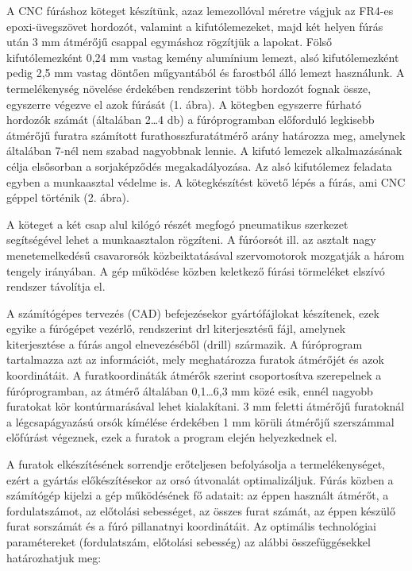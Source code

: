 \documentclass[../labor.tex]{subfiles}
\begin{document}
    A CNC fúráshoz köteget készítünk, azaz lemezollóval méretre vágjuk az FR4-es epoxi-üvegszövet hordozót, valamint a kifutólemezeket, majd két helyen fúrás után 3 mm átmérőjű csappal egymáshoz rögzítjük a lapokat. Fölső kifutólemezként 0,24 mm vastag kemény alumínium lemezt, alsó kifutólemezként pedig 2,5 mm vastag döntően műgyantából és farostból álló lemezt használunk. A termelékenység növelése érdekében rendszerint több hordozót fognak össze, egyszerre végezve el azok fúrását (1. ábra). A kötegben egyszerre fúrható hordozók számát (általában 2…4 db) a fúróprogramban előforduló legkisebb átmérőjű furatra számított furathosszfuratátmérő arány határozza meg, amelynek általában 7-nél nem szabad nagyobbnak lennie. A kifutó lemezek alkalmazásának célja elsősorban a sorjaképződés megakadályozása. Az alsó kifutólemez feladata egyben a munkaasztal védelme is. A kötegkészítést követő lépés a fúrás, ami CNC géppel történik (2. ábra).
    



    A köteget a két csap alul kilógó részét megfogó pneumatikus szerkezet segítségével lehet a munkaasztalon rögzíteni. A fúróorsót ill. az asztalt nagy menetemelkedésű csavarorsók közbeiktatásával szervomotorok mozgatják a három tengely irányában. A gép működése közben keletkező fúrási törmeléket elszívó rendszer távolítja el.

    A számítógépes tervezés (CAD) befejezésekor gyártófájlokat készítenek, ezek egyike a fúrógépet vezérlő, rendszerint drl kiterjesztésű fájl, amelynek kiterjesztése a fúrás angol elnevezéséből (drill) származik. A fúróprogram tartalmazza azt az információt, mely meghatározza furatok átmérőjét és azok koordinátáit. A furatkoordináták átmérők szerint csoportosítva szerepelnek a fúróprogramban, az átmérő általában 0,1…6,3 mm közé esik, ennél nagyobb furatokat kör kontúrmarásával lehet kialakítani. 3 mm feletti átmérőjű furatoknál a légcsapágyazású orsók kímélése érdekében 1 mm körüli átmérőjű szerszámmal előfúrást végeznek, ezek a furatok a program elején helyezkednek el.
    
    A furatok elkészítésének sorrendje erőteljesen befolyásolja a termelékenységet, ezért a gyártás előkészítésekor az orsó útvonalát optimalizáljuk. Fúrás közben a számítógép kijelzi a gép működésének fő adatait: az éppen használt átmérőt, a fordulatszámot, az előtolási sebességet, az összes furat számát, az éppen készülő furat sorszámát és a fúró pillanatnyi koordinátáit. Az optimális technológiai paramétereket (fordulatszám, előtolási sebesség) az alábbi összefüggésekkel határozhatjuk meg:
\end{document}

